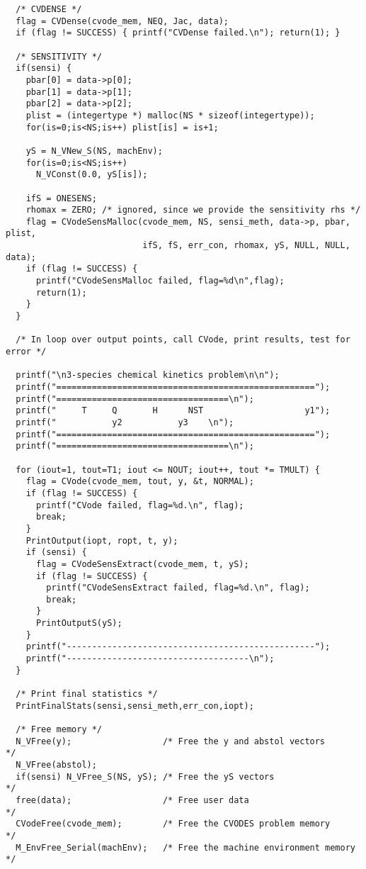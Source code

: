 \begin{verbatim}
  /* CVDENSE */
  flag = CVDense(cvode_mem, NEQ, Jac, data);
  if (flag != SUCCESS) { printf("CVDense failed.\n"); return(1); }

  /* SENSITIVITY */
  if(sensi) {
    pbar[0] = data->p[0];
    pbar[1] = data->p[1];
    pbar[2] = data->p[2];
    plist = (integertype *) malloc(NS * sizeof(integertype));
    for(is=0;is<NS;is++) plist[is] = is+1;

    yS = N_VNew_S(NS, machEnv);
    for(is=0;is<NS;is++)
      N_VConst(0.0, yS[is]);

    ifS = ONESENS;
    rhomax = ZERO; /* ignored, since we provide the sensitivity rhs */
    flag = CVodeSensMalloc(cvode_mem, NS, sensi_meth, data->p, pbar, plist,
                           ifS, fS, err_con, rhomax, yS, NULL, NULL, data);
    if (flag != SUCCESS) {
      printf("CVodeSensMalloc failed, flag=%d\n",flag);
      return(1);
    }
  }
  
  /* In loop over output points, call CVode, print results, test for error */

  printf("\n3-species chemical kinetics problem\n\n");
  printf("===================================================");
  printf("==================================\n");
  printf("     T     Q       H      NST                    y1");
  printf("           y2           y3    \n");
  printf("===================================================");
  printf("==================================\n");

  for (iout=1, tout=T1; iout <= NOUT; iout++, tout *= TMULT) {
    flag = CVode(cvode_mem, tout, y, &t, NORMAL);
    if (flag != SUCCESS) {
      printf("CVode failed, flag=%d.\n", flag); 
      break; 
    }
    PrintOutput(iopt, ropt, t, y);
    if (sensi) {
      flag = CVodeSensExtract(cvode_mem, t, yS);
      if (flag != SUCCESS) { 
        printf("CVodeSensExtract failed, flag=%d.\n", flag); 
        break; 
      }
      PrintOutputS(yS);
    } 
    printf("-------------------------------------------------");
    printf("------------------------------------\n");
  }

  /* Print final statistics */
  PrintFinalStats(sensi,sensi_meth,err_con,iopt);

  /* Free memory */
  N_VFree(y);                  /* Free the y and abstol vectors       */
  N_VFree(abstol);   
  if(sensi) N_VFree_S(NS, yS); /* Free the yS vectors                 */
  free(data);                  /* Free user data                      */
  CVodeFree(cvode_mem);        /* Free the CVODES problem memory      */
  M_EnvFree_Serial(machEnv);   /* Free the machine environment memory */


\end{verbatim}
